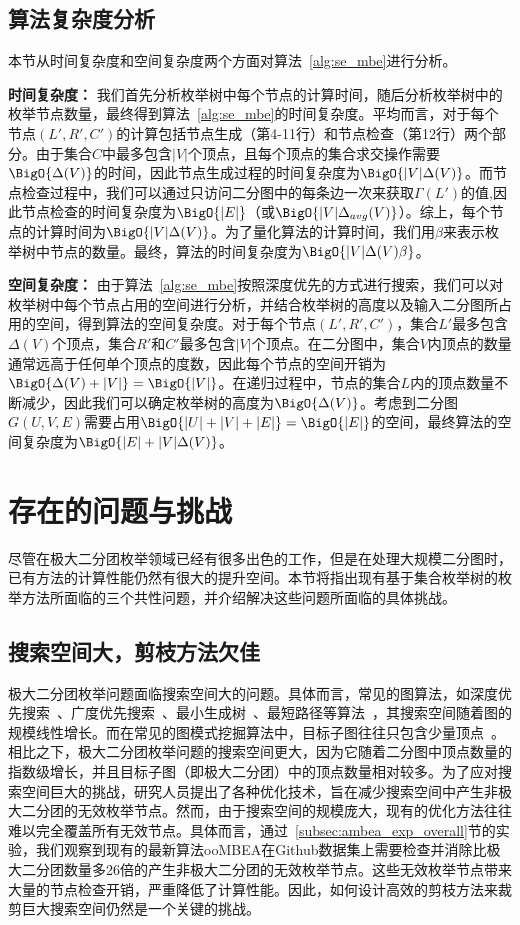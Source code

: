 \subsection{算法复杂度分析}
本节从时间复杂度和空间复杂度两个方面对算法~\ref{alg:se_mbe}进行分析。

\textbf{时间复杂度：} 我们首先分析枚举树中每个节点的计算时间，随后分析枚举树中的枚举节点数量，最终得到算法~\ref{alg:se_mbe}的时间复杂度。平均而言，对于每个节点$(L',R',C')$的计算包括节点生成（第4-11行）和节点检查（第12行）两个部分。由于集合$C$中最多包含$|V|$个顶点，且每个顶点的集合求交操作需要$\BigO{\Delta(V)}$的时间，因此节点生成过程的时间复杂度为$\BigO{|V|\Delta(V)}$。而节点检查过程中，我们可以通过只访问二分图中的每条边一次来获取$\Gamma(L')$的值,因此节点检查的时间复杂度为$\BigO{|E|}$（或$\BigO{|V|\Delta_{avg}(V)}$）。综上，每个节点的计算时间为$\BigO{|V|\Delta(V)}$。为了量化算法的计算时间，我们用$\beta$来表示枚举树中节点的数量。最终，算法的时间复杂度为$\BigO{|V|\Delta(V)\beta}$。

\textbf{空间复杂度：} 由于算法~\ref{alg:se_mbe}按照深度优先的方式进行搜索，我们可以对枚举树中每个节点占用的空间进行分析，并结合枚举树的高度以及输入二分图所占用的空间，得到算法的空间复杂度。对于每个节点$(L',R',C')$，集合$L'$最多包含$\Delta(V)$个顶点，集合$R'$和$C'$最多包含$|V|$个顶点。在二分图中，集合$V$内顶点的数量通常远高于任何单个顶点的度数，因此每个节点的空间开销为$\BigO{\Delta(V)+|V|}=\BigO{|V|}$。在递归过程中，节点的集合$L$内的顶点数量不断减少，因此我们可以确定枚举树的高度为$\BigO{\Delta(V)}$。考虑到二分图$G(U,V,E)$需要占用$\BigO{|U|+|V|+|E|}=\BigO{|E|}$的空间，最终算法的空间复杂度为$\BigO{|E|+|V|\Delta(V)}$。

\section{存在的问题与挑战}

尽管在极大二分团枚举领域已经有很多出色的工作，但是在处理大规模二分图时，已有方法的计算性能仍然有很大的提升空间。本节将指出现有基于集合枚举树的枚举方法所面临的三个共性问题，并介绍解决这些问题所面临的具体挑战。

\subsection{搜索空间大，剪枝方法欠佳}

极大二分团枚举问题面临搜索空间大的问题。具体而言，常见的图算法，如深度优先搜索~\cite{wiki-dfs}、广度优先搜索~\cite{wiki-bfs}、最小生成树~\cite{wiki-mst}、最短路径等算法~\cite{wiki-sssp}，其搜索空间随着图的规模线性增长。而在常见的图模式挖掘算法中，目标子图往往只包含少量顶点~\cite{g2miner22,decomine22,khuzdul23,gamma23}。相比之下，极大二分团枚举问题的搜索空间更大，因为它随着二分图中顶点数量的指数级增长，并且目标子图（即极大二分团）中的顶点数量相对较多。为了应对搜索空间巨大的挑战，研究人员提出了各种优化技术，旨在减少搜索空间中产生非极大二分团的无效枚举节点。然而，由于搜索空间的规模庞大，现有的优化方法往往难以完全覆盖所有无效节点。具体而言，通过~\ref{subsec:ambea_exp_overall}节的实验，我们观察到现有的最新算法ooMBEA在Github数据集上需要检查并消除比极大二分团数量多26倍的产生非极大二分团的无效枚举节点。这些无效枚举节点带来大量的节点检查开销，严重降低了计算性能。因此，如何设计高效的剪枝方法来裁剪巨大搜索空间仍然是一个关键的挑战。

